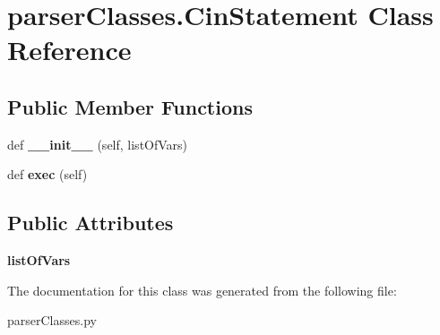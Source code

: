 \hypertarget{classparser_classes_1_1_cin_statement}{}\section{parser\+Classes.\+Cin\+Statement Class Reference}
\label{classparser_classes_1_1_cin_statement}
\subsection*{Public Member Functions}
\begin{DoxyCompactItemize}
\item 
\mbox{\label{classparser_classes_1_1_cin_statement_acf7ddabfd6a2442fbebb6b68e21e5fb0}} 
def {\bfseries \+\_\+\+\_\+init\+\_\+\+\_\+} (self, list\+Of\+Vars)
\item 
\mbox{\label{classparser_classes_1_1_cin_statement_a719297478a7bd37daa8207850f8c15fe}} 
def {\bfseries exec} (self)
\end{DoxyCompactItemize}
\subsection*{Public Attributes}
\begin{DoxyCompactItemize}
\item 
\mbox{\label{classparser_classes_1_1_cin_statement_a38f94082002dad9d674aefb99282b159}} 
{\bfseries list\+Of\+Vars}
\end{DoxyCompactItemize}


The documentation for this class was generated from the following file\+:\begin{DoxyCompactItemize}
\item 
parser\+Classes.\+py\end{DoxyCompactItemize}
